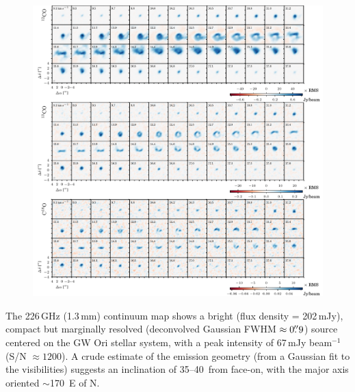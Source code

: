 \documentclass[twocolumn]{aastex61}
\begin{document}
\begin{figure}[ht!]
\begin{center}
  \includegraphics{chmaps_all.pdf}
  \end{center}
\end{figure}

The 226\,GHz (1.3\,mm) continuum map shows a bright (flux density = 202\,mJy), compact but marginally resolved (deconvolved Gaussian FWHM $\approx 0\mbox{$.\!\!^{\prime\prime}$}9$) source centered on the GW Ori stellar system, with a peak intensity of 67\,mJy beam$^{-1}$ (S/N $\approx 1200$).  A crude estimate of the emission geometry (from a Gaussian fit to the visibilities) suggests an inclination of 35--40\degr\ from face-on, with the major axis oriented $\sim$170\degr\ E of N.
\end{document}

